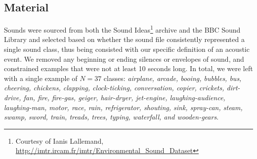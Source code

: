 \documentclass[a4paper,10pt,final]{ThesisStyle}
\begin{document}

\subsection{Material}
Sounds were sourced from both the Sound Ideas\footnote{Courtesy of Ianis Lallemand, \url{http://imtr.ircam.fr/imtr/Environmental\_Sound\_Dataset}} archive and the BBC Sound Library and selected based on whether the sound file consistently represented a single sound class, thus being consisted with our specific definition of an acoustic event.  We removed any beginning or ending silences or envelopes of sound, and constrained examples that were not at least 10 seconds long.  In total, we were left with a single example of $N = 37$ classes: \textit{airplane, arcade, booing, bubbles, bus, cheering, chickens, clapping, clock-ticking, conversation, copier, crickets, dirt-drive, fan, fire, fire-gas, geiger, hair-dryer, jet-engine, laughing-audience, laughing-man, motor, race, rain, refrigerator, shouting, sink, spray-can, steam, swamp, sword, train, treads, trees, typing, waterfall, and wooden-gears}.  
\end{document}
